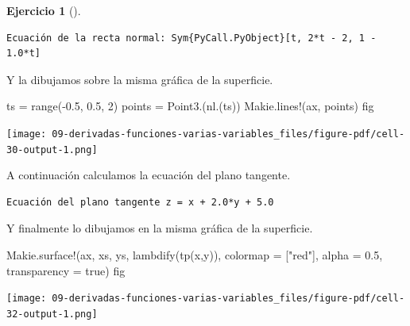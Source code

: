 \documentclass[
  a4paper,
]{scrreport}
\newenvironment{Shaded}{\begin{snugshade}}{\end{snugshade}}
\newcommand{\BuiltInTok}[1]{\textcolor[rgb]{0.00,0.23,0.31}{#1}}
\newcommand{\ConstantTok}[1]{\textcolor[rgb]{0.56,0.35,0.01}{#1}}
\newcommand{\FloatTok}[1]{\textcolor[rgb]{0.68,0.00,0.00}{#1}}
\newcommand{\FunctionTok}[1]{\textcolor[rgb]{0.28,0.35,0.67}{#1}}
\newcommand{\ImportTok}[1]{\textcolor[rgb]{0.00,0.46,0.62}{#1}}
\newcommand{\NormalTok}[1]{\textcolor[rgb]{0.00,0.23,0.31}{#1}}
\newcommand{\OperatorTok}[1]{\textcolor[rgb]{0.37,0.37,0.37}{#1}}
\newcommand{\SpecialCharTok}[1]{\textcolor[rgb]{0.37,0.37,0.37}{#1}}
\newcommand{\StringTok}[1]{\textcolor[rgb]{0.13,0.47,0.30}{#1}}
\theoremstyle{definition}
\newtheorem{exercise}{Ejercicio}[chapter]
\theoremstyle{remark}
\begin{document}
\begin{exercise}[]
\begin{tcolorbox}
\begin{verbatim}
Ecuación de la recta normal: Sym{PyCall.PyObject}[t, 2*t - 2, 1 - 1.0*t]
\end{verbatim}

Y la dibujamos sobre la misma gráfica de la superficie.

\begin{Shaded}
\begin{Highlighting}[]
\NormalTok{ts }\OperatorTok{=} \FunctionTok{range}\NormalTok{(}\OperatorTok{{-}}\FloatTok{0.5}\NormalTok{, }\FloatTok{0.5}\NormalTok{, }\FloatTok{2}\NormalTok{)}
\NormalTok{points }\OperatorTok{=} \FunctionTok{Point3}\NormalTok{.(}\FunctionTok{nl}\NormalTok{.(ts))}
\NormalTok{Makie.}\FunctionTok{lines!}\NormalTok{(ax, points)}
\NormalTok{fig}
\end{Highlighting}
\end{Shaded}

\texttt{[image: 09-derivadas-funciones-varias-variables\_files/figure-pdf/cell-30-output-1.png]}

A continuación calculamos la ecuación del plano tangente.

\begin{Shaded}
\end{Shaded}

\begin{verbatim}
Ecuación del plano tangente z = x + 2.0*y + 5.0
\end{verbatim}

Y finalmente lo dibujamos en la misma gráfica de la superficie.

\begin{Shaded}
\begin{Highlighting}[]
\NormalTok{Makie.}\FunctionTok{surface!}\NormalTok{(ax, xs, ys, }\FunctionTok{lambdify}\NormalTok{(}\FunctionTok{tp}\NormalTok{(x,y)), colormap }\OperatorTok{=}\NormalTok{ [}\StringTok{"red"}\NormalTok{], alpha }\OperatorTok{=} \FloatTok{0.5}\NormalTok{, transparency }\OperatorTok{=} \ConstantTok{true}\NormalTok{)}
\NormalTok{fig}
\end{Highlighting}
\end{Shaded}

\texttt{[image: 09-derivadas-funciones-varias-variables\_files/figure-pdf/cell-32-output-1.png]}

\end{tcolorbox}

\end{exercise}
\end{document}
